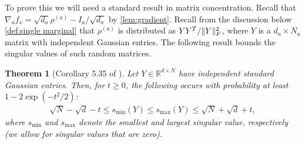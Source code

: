 \documentclass[aos]{imsart}
\newtheorem{theorem}{Theorem}
\theoremstyle{definition}
\DeclarePairedDelimiter{\norm}{\lVert}{\rVert}
\newcommand{\R}{{\mathbb{R}}}
\newcommand{\samp}{x}
\begin{document}
To prove this we will need a standard result in matrix concentration.
Recall that $\nabla_a f_{\samp} = \sqrt{d_a} \rho^{(a)} - I_a/\sqrt{d_a}$ by \cref{lem:gradient}.
Recall from the discussion below \cref{def:single marginal} that $\rho^{(a)}$ is distributed as $Y Y^T / \norm{Y}_F^2$, where $Y$ is a $d_a \times N_a$ matrix with independent Gaussian entries.
The following result bounds the singular values of such random matrices.

\begin{theorem}[Corollary 5.35 of \cite{vershynin2010introduction}]\label{cor:vershynin}
Let $Y \in \R^{d \times N}$ have independent standard Gaussian entries.
Then, for $t \geq 0$, the following occurs with probability at least $1 - 2 \exp(-t^{2}/2)$:
\begin{align*}
  \sqrt{N} - \sqrt{d} - t \leq s_{\min}(Y) \leq s_{\max}(Y) \leq \sqrt{N} + \sqrt{d} + t,
\end{align*}
where $s_{\min}$ and $s_{\max}$ denote the smallest and largest singular value, respectively (we allow for singular values that are zero).
\end{theorem}
\end{document}
